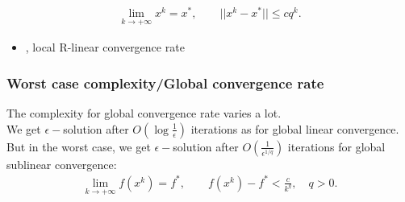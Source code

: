 	\begin{eqnarray*}
		\lim\limits_{k\rightarrow +\infty} x^k=x^*,\qquad
		||x^k-x^*|| \leq cq^k.
	\end{eqnarray*}
	\begin{itemize}
		\item {}, local R-linear convergence rate
	\end{itemize}


	\subsubsection{Worst case complexity/Global convergence rate}
The  complexity for global convergence rate varies a lot.\\
We get $\epsilon-$solution after $O\left(\log \frac{1}{\epsilon}\right)$ iterations as for global linear convergence. \\
But in the worst case, we get $\epsilon-$solution after $O\left(\frac{1}{\epsilon^{1/q}}\right)$ iterations for global sublinear convergence:
\begin{eqnarray*}
			\lim\limits_{k\rightarrow +\infty} f(x^k)=f^*,\qquad
			f(x^k)-f^*<\frac{c}{k^q},\quad q>0.
\end{eqnarray*}

